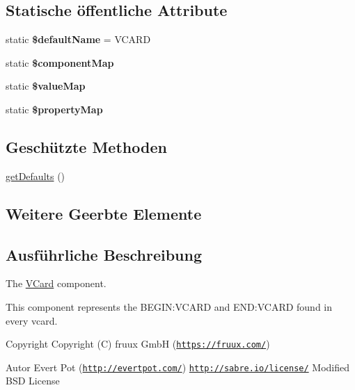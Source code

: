 \subsection*{Statische öffentliche Attribute}
\begin{DoxyCompactItemize}
\item 
\mbox{\label{class_sabre_1_1_v_object_1_1_component_1_1_v_card_a5c77a49992de6feac8f12f9692a01fa5}} 
static {\bfseries \$default\+Name} = \textquotesingle{}V\+C\+A\+RD\textquotesingle{}
\item 
static {\bfseries \$component\+Map}
\item 
static {\bfseries \$value\+Map}
\item 
static {\bfseries \$property\+Map}
\end{DoxyCompactItemize}
\subsection*{Geschützte Methoden}
\begin{DoxyCompactItemize}
\item 
\mbox{\hyperlink{class_sabre_1_1_v_object_1_1_component_1_1_v_card_a0f7b2fb1f4b5642260a2aeaace8f4694}{get\+Defaults}} ()
\end{DoxyCompactItemize}
\subsection*{Weitere Geerbte Elemente}


\subsection{Ausführliche Beschreibung}
The \mbox{\hyperlink{class_sabre_1_1_v_object_1_1_component_1_1_v_card}{V\+Card}} component.

This component represents the B\+E\+G\+IN\+:V\+C\+A\+RD and E\+ND\+:V\+C\+A\+RD found in every vcard.

\begin{DoxyCopyright}{Copyright}
Copyright (C) fruux GmbH (\href{https://fruux.com/}{\tt https\+://fruux.\+com/}) 
\end{DoxyCopyright}
\begin{DoxyAuthor}{Autor}
Evert Pot (\href{http://evertpot.com/}{\tt http\+://evertpot.\+com/})  \href{http://sabre.io/license/}{\tt http\+://sabre.\+io/license/} Modified B\+SD License 
\end{DoxyAuthor}


